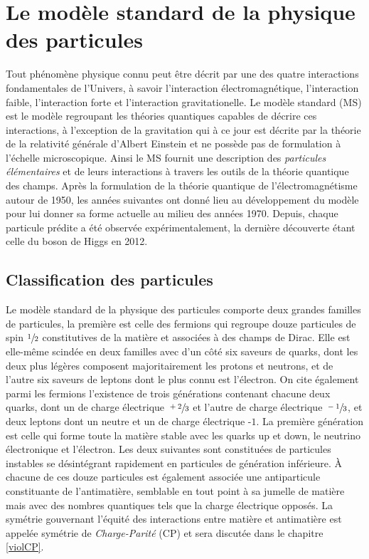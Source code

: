     \chapter{Le modèle standard de la physique des particules}

    Tout phénomène physique connu peut être décrit par une des quatre interactions fondamentales de l'Univers, à savoir l'interaction électromagnétique, l'interaction faible, l'interaction forte et l'interaction gravitationelle. Le modèle standard (MS) est le modèle regroupant les théories quantiques capables de décrire ces interactions, à l'exception de la gravitation qui à ce jour est décrite par la théorie de la relativité générale d'Albert Einstein et ne possède pas de formulation à l'échelle microscopique. Ainsi le MS fournit une description des \textit{particules élémentaires} et de leurs interactions à travers les outils de la théorie quantique des champs. Après la formulation de la théorie quantique de l'électromagnétisme autour de 1950, les années suivantes ont donné lieu au développement du modèle pour lui donner sa forme actuelle au milieu des années 1970. Depuis, chaque particule prédite a été observée expérimentalement, la dernière découverte étant celle du boson de Higgs en 2012.

    \section{Classification des particules}

    Le modèle standard de la physique des particules comporte deux grandes familles de particules, la première est celle des fermions qui regroupe douze particules de spin $\sfrac{1}{2}$ constitutives de la matière et associées à des champs de Dirac. Elle est elle-même scindée en deux familles avec d'un côté six saveurs de quarks, dont les deux plus légères composent majoritairement les protons et neutrons, et de l'autre six saveurs de leptons dont le plus connu est l'électron. On cite également parmi les fermions l'existence de trois générations contenant chacune deux quarks, dont un de charge électrique $\sfrac{+2}{3}$ et l'autre de charge électrique $\sfrac{-1}{3}$, et deux leptons dont un neutre et un de charge électrique -$1$. La première génération est celle qui forme toute la matière stable avec les quarks up et down, le neutrino électronique et l'électron. Les deux suivantes sont constituées de particules instables se désintégrant rapidement en particules de génération inférieure. À chacune de ces douze particules est également associée une antiparticule constituante de l'antimatière, semblable en tout point à sa jumelle de matière mais avec des nombres quantiques tels que la charge électrique opposés. La symétrie gouvernant l'équité des interactions entre matière et antimatière est appelée symétrie de \textit{Charge-Parité} (CP) et sera discutée dans le chapitre \ref{violCP}.

